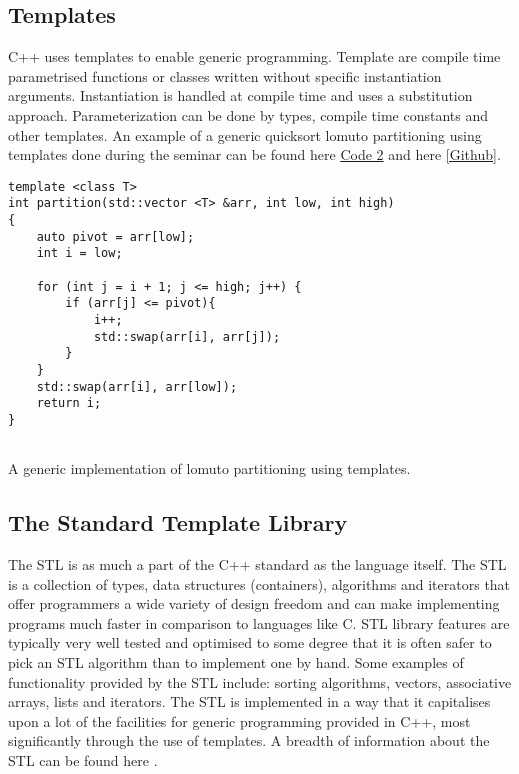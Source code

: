\documentclass[conference, a4paper]{IEEEtran}
\begin{document}
\subsection{Templates}

C++ uses templates to enable generic programming. Template are compile time parametrised functions or classes written without specific instantiation arguments. Instantiation is handled at compile time and uses a substitution approach. Parameterization can be done by types, compile time constants and other templates. An example of a generic quicksort lomuto partitioning using templates done during the seminar can be found here \hyperref[listing:2]{Code 2} and here \textcolor{cyan}{\href{https://github.com/qasimwarraich/PLP/blob/master/A2/Task1/quicksort/quicksort.cpp}{[Github]}}.


\begin{listing}[htb]
\begin{verbatim}
template <class T>
int partition(std::vector <T> &arr, int low, int high)
{
    auto pivot = arr[low];
    int i = low;

    for (int j = i + 1; j <= high; j++) {
        if (arr[j] <= pivot){
            i++;
            std::swap(arr[i], arr[j]);
        }
    }
    std::swap(arr[i], arr[low]);
    return i; 
}
        
    \end{verbatim}
    
    \caption{A generic implementation of lomuto partitioning using templates.}
\label{listing:2}
\end{listing}

\subsection{The Standard Template Library}
The STL is as much a part of the C++ standard as the language itself. The STL is a collection of types, data structures (containers), algorithms and iterators that offer programmers a wide variety of design freedom and can make implementing programs much faster in comparison to languages like C. STL library features are typically very well tested and optimised to some degree that it is often safer to pick an STL algorithm than to implement one by hand. Some examples of functionality provided by the STL include: sorting algorithms, vectors, associative arrays, lists and iterators. The STL is implemented in a way that it capitalises upon a lot of the facilities for generic programming provided in C++, most significantly through the use of templates. A breadth of information about the STL can be found here \cite{josuttis2012c++}.
\end{document}
